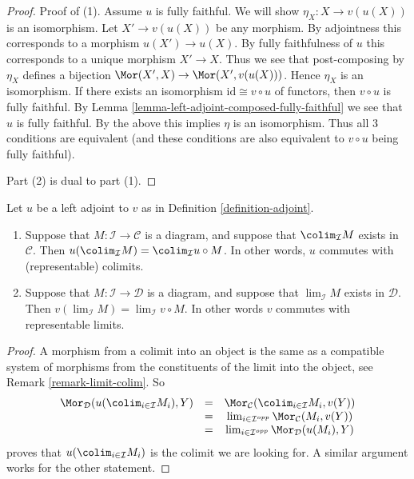 \begin{proof}
Proof of (1).
Assume $u$ is fully faithful. We will show $\eta_X : X \to v(u(X))$
is an isomorphism. Let $X' \to v(u(X))$ be any morphism.
By adjointness this corresponds to a morphism $u(X') \to u(X)$. By fully
faithfulness of $u$ this corresponds to a unique morphism $X' \to X$.
Thus we see that post-composing by $\eta_X$ defines a bijection
$\Mor(X', X) \to \Mor(X', v(u(X)))$. Hence $\eta_X$ is an isomorphism.
If there exists an isomorphism $\text{id} \cong v \circ u$ of functors,
then $v \circ u$ is fully faithful. By
Lemma \ref{lemma-left-adjoint-composed-fully-faithful} we see
that $u$ is fully faithful. By the above this implies $\eta$
is an isomorphism. Thus all $3$ conditions are equivalent (and these
conditions are also equivalent to $v \circ u$ being fully faithful).

\medskip\noindent
Part (2) is dual to part (1).
\end{proof}

\begin{lemma}
\label{lemma-adjoint-exact}
Let $u$ be a left adjoint to $v$ as in Definition \ref{definition-adjoint}.
\begin{enumerate}
\item Suppose that $M : \mathcal{I} \to \mathcal{C}$ is a diagram,
and suppose that $\colim_\mathcal{I} M$ exists in
$\mathcal{C}$. Then $u(\colim_\mathcal{I} M) =
\colim_\mathcal{I} u \circ M$. In other words,
$u$ commutes with (representable) colimits.
\item Suppose that $M : \mathcal{I} \to \mathcal{D}$ is a diagram,
and suppose that $\lim_\mathcal{I} M$ exists in
$\mathcal{D}$. Then $v(\lim_\mathcal{I} M) =
\lim_\mathcal{I} v \circ M$. In other words $v$ commutes
with representable limits.
\end{enumerate}
\end{lemma}

\begin{proof}
A morphism from a colimit into an object is the same as a compatible
system of morphisms from the constituents of the limit into the
object, see Remark \ref{remark-limit-colim}. So
$$
\begin{matrix}
\Mor_\mathcal{D}(u(\colim_{i \in \mathcal{I}} M_i), Y) &
= & \Mor_\mathcal{C}(\colim_{i \in \mathcal{I}} M_i, v(Y)) \\
& = &
\lim_{i \in \mathcal{I}^{opp}}
\Mor_\mathcal{C}(M_i, v(Y)) \\
& = &
\lim_{i \in \mathcal{I}^{opp}}
\Mor_\mathcal{D}(u(M_i), Y)
\end{matrix}
$$
proves that $u(\colim_{i \in \mathcal{I}} M_i)$ is
the colimit we are looking for.
A similar argument works for the other statement.
\end{proof}

